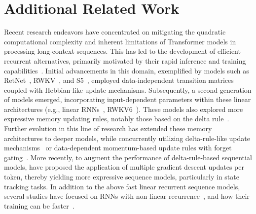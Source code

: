 \section{Additional Related Work}\label{app:rw}




Recent research endeavors have concentrated on mitigating the quadratic computational complexity and inherent limitations of Transformer models in processing long-context sequences. This has led to the development of efficient recurrent alternatives, primarily motivated by their rapid inference and training capabilities~\citep{tiezzi2024resurgence}. Initial advancements in this domain, exemplified by models such as RetNet~\citep{sun2023retentive}, RWKV~\citep{peng2023rwkv}, and S5~\citep{smith2023simplified}, employed data-independent transition matrices coupled with Hebbian-like update mechanisms. Subsequently, a second generation of models emerged, incorporating input-dependent parameters within these linear architectures (e.g., linear RNNs~\citep{hasani2023liquid, smith2023simplified}, RWKV6~\citep{peng2024eagle}). These models also explored more expressive memory updating rules, notably those based on the delta rule~\citep{peng2025rwkv7, schlag2021linear, yang2024parallelizing, yang2024gated, liu2024longhorn}. Further evolution in this line of research has extended these memory architectures to deeper models, while concurrently utilizing delta-rule-like update mechanisms~\citep{sun2024learning} or data-dependent momentum-based update rules with forget gating~\citep{behrouz2024titans}. More recently, to augment the performance of delta-rule-based sequential models, \citet{siems2025deltaproduct} have proposed the application of multiple gradient descent updates per token, thereby yielding more expressive sequence models, particularly in state tracking tasks. In addition to the above fast linear recurrent sequence models, several studies have focused on RNNs with non-linear recurrence~\citep{behrouz2025Miras, csordas2024recurrent, merrill2024the, lim2024parallelizing,  schone2025implicit, karami2025lattice, von2023uncovering, gonzalez2024towards}, and how their training can be faster~\citep{gonzalez2024towards, lim2024parallelizing, schone2025implicit}. 







